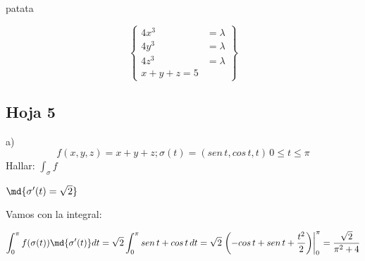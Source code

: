 \begin{problem}[19]
patata
\solution

\[\left\{
\begin{array}{cc}
4x^3&=\lambda\\
4y^3&=\lambda\\
4z^3&=\lambda\\
x+y+z=5
\end{array}\right\}\]
\end{problem}

\subsection{Hoja 5}

\begin{problem}[2]
a) \[f(x,y,z) = x+y+z; \sigma(t) = (sen\,t,cos\,t,t)\, 0\leq t\leq \pi\]
Hallar: $\displaystyle \int_{\sigma}f$

\solution

$\md{\sigma'(t) = \sqrt{2}}$

Vamos con la integral:

\[\int_0^{\pi} f(\sigma(t))\md{\sigma'(t)} dt = \sqrt{2}\int_0^{\pi} sen\,t+cos\,t\,dt = \sqrt{2}\left.\left(-cos\,t+sen\,t+\frac{t^2}{2}\right)\right|_{0}^{\pi} = \frac{\sqrt{2}}{\pi^2+4}\]

\end{problem}

